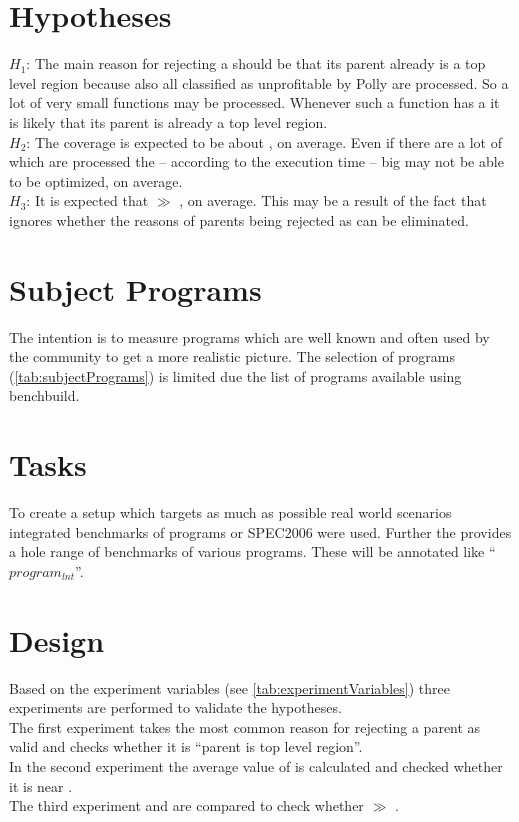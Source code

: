 \section{Hypotheses}
\(H_1\): The main reason for rejecting a \scop should be that its parent already is a top level region because also all \scops classified as unprofitable by Polly are processed.
So a lot of very small functions may be processed.
Whenever such a function has a \scop it is likely that its parent is already a top level region.\\
\(H_2\): The coverage \dyncovs is expected to be about \hTwoAbout, on average.
Even if there are a lot of \scops which are processed the -- according to the execution time -- big \scops may not be able to be optimized, on average.\\
\(H_3\): It is expected that \dyncovp \(\gg\) \dyncovs, on average.
This may be a result of the fact that \dyncovp ignores whether the reasons of parents being rejected as \scop can be eliminated.\\

\section{Subject Programs}
The intention is to measure programs which are well known and often used by the community to get a more realistic picture.
The selection of programs (\autoref{tab:subjectPrograms}) is limited due the list of programs available using benchbuild.

\section{Tasks}
To create a setup which targets as much as possible real world scenarios integrated benchmarks of programs or SPEC2006 were used.
Further the \lnt provides a hole range of benchmarks of various programs.
These will be annotated like \enquote{\(program_{lnt}\)}.

\section{Design}
Based on the experiment variables (see \autoref{tab:experimentVariables}) three experiments are performed to validate the hypotheses.\\
The first experiment takes the most common reason for rejecting a parent as valid \scop and checks whether it is \enquote{parent is top level region}.\\
In the second experiment the average value of \dyncovs is calculated and checked whether it is near \hTwoAbout.\\
The third experiment \dyncovp and \dyncovs are compared to check whether \dyncovp \(\gg\) \dyncovs.

